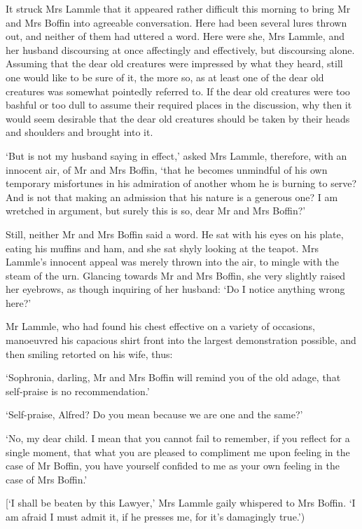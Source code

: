 It struck Mrs Lammle that it appeared rather difficult this morning
to bring Mr and Mrs Boffin into agreeable conversation. Here had been
several lures thrown out, and neither of them had uttered a word. Here
were she, Mrs Lammle, and her husband discoursing at once affectingly
and effectively, but discoursing alone. Assuming that the dear old
creatures were impressed by what they heard, still one would like to be
sure of it, the more so, as at least one of the dear old creatures
was somewhat pointedly referred to. If the dear old creatures were too
bashful or too dull to assume their required places in the discussion,
why then it would seem desirable that the dear old creatures should be
taken by their heads and shoulders and brought into it.

‘But is not my husband saying in effect,’ asked Mrs Lammle, therefore,
with an innocent air, of Mr and Mrs Boffin, ‘that he becomes unmindful
of his own temporary misfortunes in his admiration of another whom he is
burning to serve? And is not that making an admission that his nature is
a generous one? I am wretched in argument, but surely this is so, dear
Mr and Mrs Boffin?’

Still, neither Mr and Mrs Boffin said a word. He sat with his eyes on
his plate, eating his muffins and ham, and she sat shyly looking at the
teapot. Mrs Lammle’s innocent appeal was merely thrown into the air, to
mingle with the steam of the urn. Glancing towards Mr and Mrs Boffin,
she very slightly raised her eyebrows, as though inquiring of her
husband: ‘Do I notice anything wrong here?’

Mr Lammle, who had found his chest effective on a variety of occasions,
manoeuvred his capacious shirt front into the largest demonstration
possible, and then smiling retorted on his wife, thus:

‘Sophronia, darling, Mr and Mrs Boffin will remind you of the old adage,
that self-praise is no recommendation.’

‘Self-praise, Alfred? Do you mean because we are one and the same?’

‘No, my dear child. I mean that you cannot fail to remember, if you
reflect for a single moment, that what you are pleased to compliment me
upon feeling in the case of Mr Boffin, you have yourself confided to me
as your own feeling in the case of Mrs Boffin.’

[‘I shall be beaten by this Lawyer,’ Mrs Lammle gaily whispered to
Mrs Boffin. ‘I am afraid I must admit it, if he presses me, for it’s
damagingly true.’)

